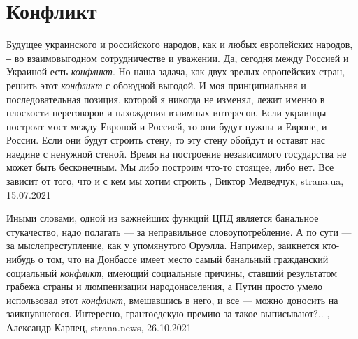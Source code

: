  
 
 
 
 
\chapter{Конфликт}
\label{sec:slova.konflikt}

Будущее украинского и российского народов, как и любых европейских народов, ‒
во взаимовыгодном сотрудничестве и уважении. Да, сегодня между Россией и
Украиной есть \emph{конфликт}. Но наша задача, как двух зрелых европейских стран,
решить этот \emph{конфликт} с обоюдной выгодой. И моя принципиальная и
последовательная позиция, которой я никогда не изменял, лежит именно в
плоскости переговоров и нахождения взаимных интересов. Если украинцы построят
мост между Европой и Россией, то они будут нужны и Европе, и России. Если они
будут строить стену, то эту стену обойдут и оставят нас наедине с ненужной
стеной. Время на построение независимого государства не может быть бесконечным.
Мы либо построим что-то стоящее, либо нет. Все зависит от того, что и с кем мы
хотим строить
, 
Виктор Медведчук, strana.ua, 15.07.2021

Иными словами, одной из важнейших функций ЦПД является банальное стукачество,
надо полагать — за неправильное словоупотребление. А по сути — за
мыслепреступление, как у упомянутого Оруэлла. Например, заикнется кто-нибудь о
том, что на Донбассе имеет место самый банальный гражданский социальный
\emph{конфликт}, имеющий социальные причины, ставший результатом грабежа страны и
люмпенизации народонаселения, а Путин просто умело использовал этот \emph{конфликт},
вмешавшись в него, и все — можно доносить на заикнувшегося. Интересно,
грантоедскую премию за такое выписывают?..
, 
Александр Карпец, strana.news, 26.10.2021

